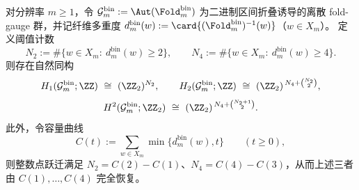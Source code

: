\begin{theorem}\label{thm:window6-foldbin-gauge-low-degree-homology}
对分辨率 \(m\ge 1\)，令
\(
\mathcal{G}^{\mathrm{bin}}_m:=\Aut(\Fold^{\mathrm{bin}}_m)
\)
为二进制区间折叠诱导的离散 fold-gauge 群，并记纤维多重度
\(
d^{\mathrm{bin}}_m(w):=\card{(\Fold^{\mathrm{bin}}_m)^{-1}(w)}
\)（\(w\in X_m\)）。
定义阈值计数
\[
N_2:=\#\{w\in X_m:\ d^{\mathrm{bin}}_m(w)\ge 2\},
\qquad
N_4:=\#\{w\in X_m:\ d^{\mathrm{bin}}_m(w)\ge 4\}.
\]
则存在自然同构
\[
H_1(\mathcal{G}^{\mathrm{bin}}_m;\ZZ)\ \cong\ (\ZZ_2)^{N_2},
\qquad
H_2(\mathcal{G}^{\mathrm{bin}}_m;\ZZ)\ \cong\ (\ZZ_2)^{\,N_4+\binom{N_2}{2}},
\]
\[
H^2(\mathcal{G}^{\mathrm{bin}}_m;\ZZ_2)\ \cong\ (\ZZ_2)^{\,N_4+\binom{N_2+1}{2}}.
\]
此外，令容量曲线
\[
C(t):=\sum_{w\in X_m}\min\{d^{\mathrm{bin}}_m(w),t\}\qquad(t\ge 0),
\]
则整数点跃迁满足 \(N_2=C(2)-C(1)\)、\(N_4=C(4)-C(3)\)，从而上述三者由 \(C(1),\dots,C(4)\) 完全恢复。
\end{theorem}
